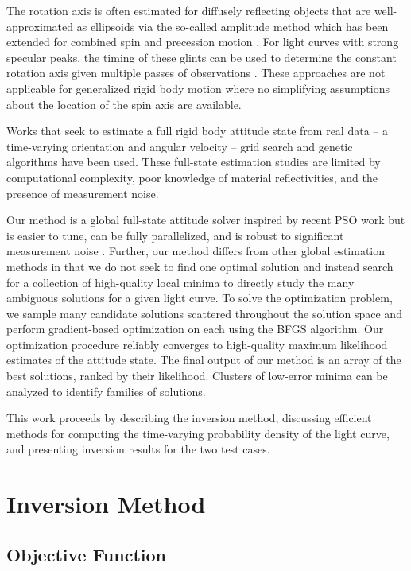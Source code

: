 \documentclass[a4paper,twocolumn]{spaceDebrisC} %
\begin{document}
The rotation axis is often estimated for diffusely reflecting objects that are well-approximated as ellipsoids via the so-called amplitude method \cite{williams1979location} which has been extended for combined spin and precession motion \cite{yanagisawa2012}. For light curves with strong specular peaks, the timing of these glints can be used to determine the constant rotation axis given multiple passes of observations \cite{vananti2023, koshkin2018}. These approaches are not applicable for generalized rigid body motion where no simplifying assumptions about the location of the spin axis are available.

Works that seek to estimate a full rigid body attitude state from real data -- a time-varying orientation and angular velocity -- grid search \cite{shafer2017} and genetic algorithms \cite{piergentili2020, gallucci2020} have been used. These full-state estimation studies are limited by computational complexity, poor knowledge of material reflectivities, and the presence of measurement noise. 

Our method is a global full-state attitude solver inspired by recent PSO work \cite{burton2024journal} but is easier to tune, can be fully parallelized, and is robust to significant measurement noise \cite{robinson2025att}. Further, our method differs from other global estimation methods in that we do not seek to find one optimal solution and instead search for a collection of high-quality local minima to directly study the many ambiguous solutions for a given light curve. To solve the optimization problem, we sample many candidate solutions scattered throughout the solution space and perform gradient-based optimization on each using the BFGS algorithm. Our optimization procedure reliably converges to high-quality maximum likelihood estimates of the attitude state. The final output of our method is an array of the best solutions, ranked by their likelihood. Clusters of low-error minima can be analyzed to identify families of solutions.

This work proceeds by describing the inversion method, discussing efficient methods for computing the time-varying probability density of the light curve, and presenting inversion results for the two test cases.

\section{Inversion Method}

\subsection{Objective Function}
\end{document}
